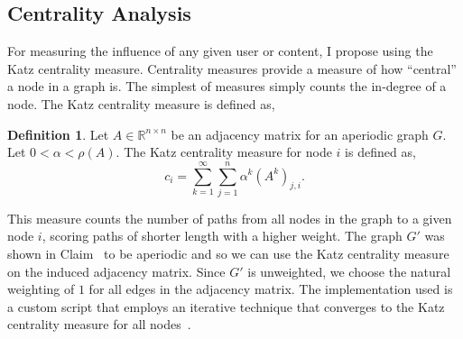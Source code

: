 \documentclass[letterpaper, 10 pt, conference]{ieeeconf}
\theoremstyle{definition}
\newtheorem{definition}{Definition}[section]
\newcommand{\R}{\mathbb{R}}
\begin{document}
\subsection{Centrality Analysis}
For measuring the influence of any given user or content, I propose using the Katz centrality measure. Centrality measures provide a measure of how ``central'' a node in a graph is. The simplest of measures simply counts the in-degree of a node. The Katz centrality measure is defined as,
\begin{definition}
  Let \(A\in \R^{n\times n}\) be an adjacency matrix for an aperiodic graph \(G.\) Let \(0 < \alpha < \rho(A)\). The Katz centrality measure for node \(i\) is defined as,
  \[
    c_i = \sum_{k=1}^\infty{ \sum_{j=1}^n {\alpha^k \left( A^k \right)_{j,i}} }.
  \]
\end{definition}
This measure counts the number of paths from all nodes in the graph to a given node \(i\), scoring paths of shorter length with a higher weight. The graph \(G'\) was shown in Claim~\cite{claim:g1:aperiodic} to be aperiodic and so we can use the Katz centrality measure on the induced adjacency matrix. Since \(G'\) is unweighted, we choose the natural weighting of \(1\) for all edges in the adjacency matrix. The implementation used is a custom script that employs an iterative technique that converges to the Katz centrality measure for all nodes~\cite{Notes:Network}.
\end{document}

